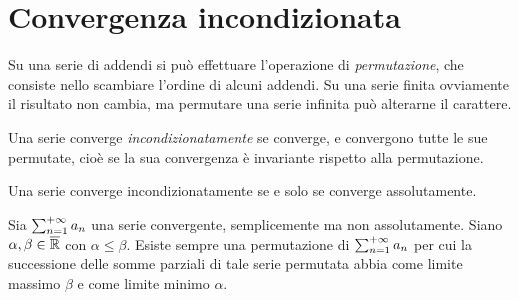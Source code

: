 \section{Convergenza incondizionata}
Su una serie di addendi si può effettuare l'operazione di \emph{permutazione}, che consiste nello scambiare l'ordine di alcuni addendi. Su una serie finita ovviamente il risultato non cambia, ma permutare una serie infinita può alterarne il carattere.
\begin{definizione}
Una serie converge \emph{incondizionatamente} se converge, e convergono tutte le sue permutate, cioè se la sua convergenza è invariante rispetto alla permutazione.
\end{definizione}
\begin{teorema}
Una serie converge incondizionatamente se e solo se converge assolutamente.
\end{teorema}
\begin{teorema}[di Riemann]
Sia $\sum_{{n}=1}^{+\infty}a_n$ una serie convergente, semplicemente ma non assolutamente. Siano $\alpha,\beta\in\overline{\mathbb{R}}$ con $\alpha\leq\beta$. Esiste sempre una permutazione di $\sum_{{n}=1}^{+\infty}a_n$ per cui la successione delle somme parziali di tale serie permutata abbia come limite massimo $\beta$ e come limite minimo $\alpha$.
\end{teorema}